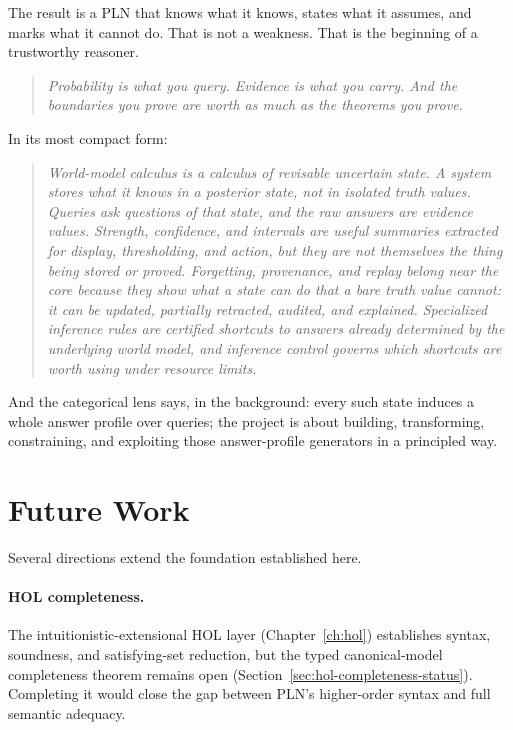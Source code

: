 \documentclass[11pt,openany]{report}
\begin{document}
The result is a PLN that knows what it knows, states what it assumes,
and marks what it cannot do.  That is not a weakness.  That is the
beginning of a trustworthy reasoner.

\begin{quote}
\emph{Probability is what you query.  Evidence is what you carry.
  And the boundaries you prove are worth as much as the theorems you prove.}
\end{quote}

\noindent
In its most compact form:

\begin{quote}
\emph{World-model calculus is a calculus of revisable uncertain state.
A system stores what it knows in a posterior state, not in isolated
truth values.  Queries ask questions of that state, and the raw answers
are evidence values.  Strength, confidence, and intervals are useful
summaries extracted for display, thresholding, and action, but they are
not themselves the thing being stored or proved.  Forgetting,
provenance, and replay belong near the core because they show what a
state can do that a bare truth value cannot: it can be updated,
partially retracted, audited, and explained.  Specialized inference
rules are certified shortcuts to answers already determined by the
underlying world model, and inference control governs which shortcuts
are worth using under resource limits.}
\end{quote}

\noindent
And the categorical lens says, in the background: every such state
induces a whole answer profile over queries; the project is about
building, transforming, constraining, and exploiting those
answer-profile generators in a principled way.

\section*{Future Work}

Several directions extend the foundation established here.

\paragraph{HOL completeness.}
The intuitionistic-extensional HOL layer (Chapter~\ref{ch:hol}) establishes
syntax, soundness, and satisfying-set reduction, but the typed canonical-model
completeness theorem remains open
(Section~\ref{sec:hol-completeness-status}).  Completing it would close the
gap between PLN's higher-order syntax and full semantic adequacy.
\end{document}
